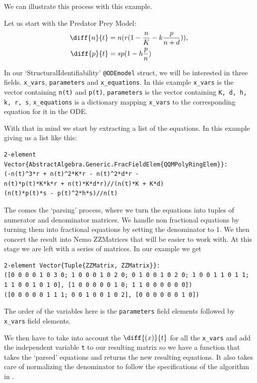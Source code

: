 \documentclass[oneside, a4paper, onecolumn, 11pt]{article}
\begin{document}
We can illustrate this process with this example.

Let us start with the Predator Prey Model:
\begin{align*}
    \diff{n}{t}
     & = n (r (1 - \frac{n}{K} - k \frac{p}{n + d})), \\
    \diff{p}{t}
     & = sp (1 - h \frac{p}{n})
\end{align*}

In our `StructuralIdentifiability' \texttt{@ODEmodel} struct, we will be interested in three fields. \texttt{x\_vars}, \texttt{parameters} and \texttt{x\_equations}. In this example \texttt{x\_vars} is the vector containing \texttt{n(t)} and \texttt{p(t)}, \texttt{parameters} is the vector containing \texttt{K, d, h, k, r, s}, \texttt{x\_equations} is a dictionary mapping \texttt{x\_vars} to the corresponding equation for it in the ODE.

With that in mind we start by extracting a list of the equations. In this example giving us a list like this:
\begin{lstlisting}
2-element Vector{AbstractAlgebra.Generic.FracFieldElem{QQMPolyRingElem}}:
(-n(t)^3*r + n(t)^2*K*r - n(t)^2*d*r - 
n(t)*p(t)*K*k*r + n(t)*K*d*r)//(n(t)*K + K*d)
(n(t)*p(t)*s - p(t)^2*h*s)//n(t)
\end{lstlisting}

The comes the `parsing' process, where we turn the equations into tuples of numerator and denominator matrices. We handle non fractional equations by turning them into fractional equations by setting the denominator to 1. We then concert the result into Nemo ZZMatrices that will be easier to work with. At this stage we are left with a series of matrices. In our example we get
\begin{lstlisting}
2-element Vector{Tuple{ZZMatrix, ZZMatrix}}:
([0 0 0 0 1 0 3 0; 1 0 0 0 1 0 2 0; 0 1 0 0 1 0 2 0; 1 0 0 1 1 0 1 1; 1 1 0 0 1 0 1 0], [1 0 0 0 0 0 1 0; 1 1 0 0 0 0 0 0])
([0 0 0 0 0 1 1 1; 0 0 1 0 0 1 0 2], [0 0 0 0 0 0 1 0])
\end{lstlisting}

The order of the variables here is the \texttt{parameters} field elements followed by \texttt{x\_vars} field elements.

We then have to take into account the \(\diff{(x)}{t}\) for all the \texttt{x\_vars} and add the independent variable \texttt{t} to our resulting matrix so we have a function that takes the `parsed' equations and returns the new resulting equations. It also takes care of normalizing the denominator to follow the specifications of the algorithm in \cite{Hubert2013}.
\end{document}
